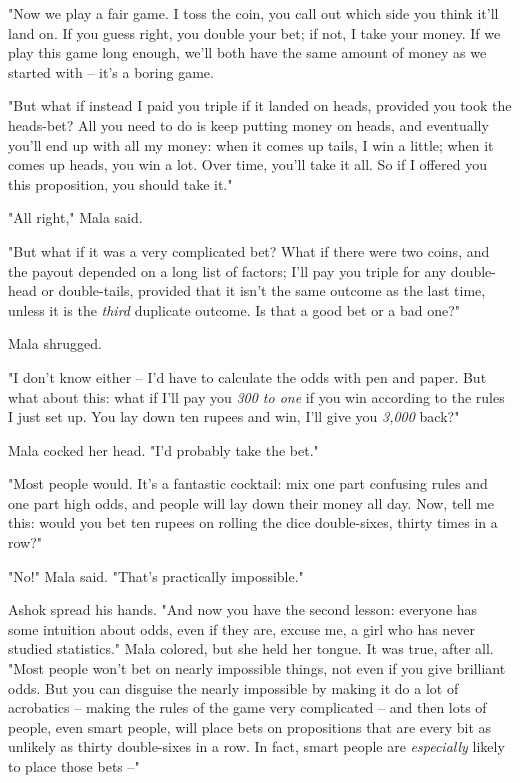 "Now we play a fair game. I toss the coin, you call out which side
you think it'll land on. If you guess right, you double your bet;
if not, I take your money. If we play this game long enough, we'll
both have the same amount of money as we started with -- it's a
boring game.

"But what if instead I paid you triple if it landed on heads,
provided you took the heads-bet? All you need to do is keep putting
money on heads, and eventually you'll end up with all my money:
when it comes up tails, I win a little; when it comes up heads, you
win a lot. Over time, you'll take it all. So if I offered you this
proposition, you should take it."

"All right," Mala said.

"But what if it was a very complicated bet? What if there were two
coins, and the payout depended on a long list of factors; I'll pay
you triple for any double-head or double-tails, provided that it
isn't the same outcome as the last time, unless it is the
\emph{third} duplicate outcome. Is that a good bet or a bad one?"

Mala shrugged.

"I don't know either -- I'd have to calculate the odds with pen and
paper. But what about this: what if I'll pay you \emph{300 to one}
if you win according to the rules I just set up. You lay down ten
rupees and win, I'll give you \emph{3,000} back?"

Mala cocked her head. "I'd probably take the bet."

"Most people would. It's a fantastic cocktail: mix one part
confusing rules and one part high odds, and people will lay down
their money all day. Now, tell me this: would you bet ten rupees on
rolling the dice double-sixes, thirty times in a row?"

"No!" Mala said. "That's practically impossible."

Ashok spread his hands. "And now you have the second lesson:
everyone has some intuition about odds, even if they are, excuse
me, a girl who has never studied statistics." Mala colored, but she
held her tongue. It was true, after all. "Most people won't bet on
nearly impossible things, not even if you give brilliant odds. But
you can disguise the nearly impossible by making it do a lot of
acrobatics -- making the rules of the game very complicated -- and
then lots of people, even smart people, will place bets on
propositions that are every bit as unlikely as thirty double-sixes
in a row. In fact, smart people are \emph{especially} likely to
place those bets --"

